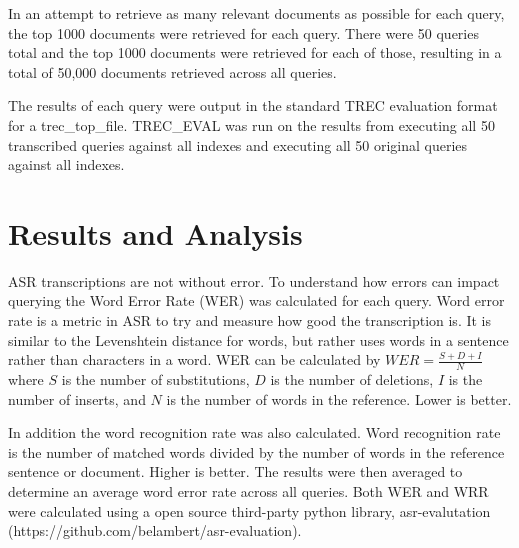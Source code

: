 \documentclass[jair, twoside,11pt,theapa]{article}
\begin{document}
In an attempt to retrieve as many relevant documents as possible for each query, the top 1000 documents were retrieved for each query. There were 50 queries total and the top 1000 documents were retrieved for each of those, resulting in a total of 50,000 documents retrieved across all queries. 

The results of each query were output in the standard TREC evaluation format for a trec\_top\_file. TREC\_EVAL was run on the results from executing all 50 transcribed queries against all indexes and executing all 50 original queries against all indexes. 


\section{Results and Analysis}
\label{Results}

ASR transcriptions are not without error. To understand how errors can impact querying the Word Error Rate (WER) was calculated for each query. Word error rate is a metric in ASR to try and measure how good the transcription is. It is similar to the Levenshtein distance for words, but rather uses words in a sentence rather than characters in a word. WER can be calculated by $WER = \frac{S + D + I}{N}$ where $S$ is the number of substitutions, $D$ is the number of deletions, $I$ is the number of inserts, and $N$ is the number of words in the reference. Lower is better. 

In addition the word recognition rate was also calculated. Word recognition rate is the number of matched words divided by the number of words in the reference sentence or document. Higher is better. The results were then averaged to determine an average word error rate across all queries. Both WER and WRR were calculated using a open source third-party python library, asr-evalutation (https://github.com/belambert/asr-evaluation).
\end{document}
